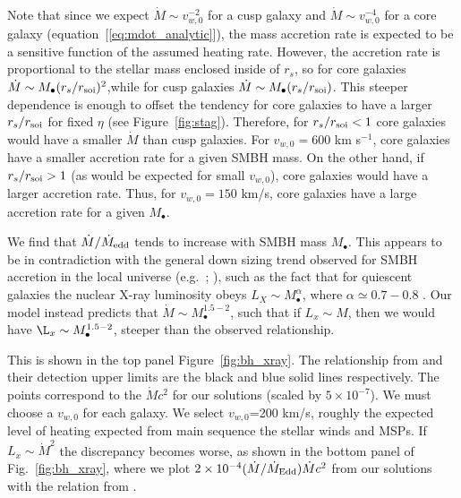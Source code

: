 \documentclass[usenatbib,fleqn]{mn2e}
\newcommand{\Mdot}{\dot{M}}
\newcommand{\eddr}{\dot{M}/\dot{M}_{\rm Edd}}
\newcommand{\rs}{r_s}
\newcommand{\Mbh}[1][]{M_{\bullet#1}}
\newcommand{\soi}{\rm soi}
\newcommand{\rsoi}{r_{\soi}}
\newcommand{\vwO}{v_{w,0}}
\begin{document}
Note that since we expect $\dot{M}\sim\vwO^{-2}$ for a cusp galaxy and
$\dot{M}\sim\vwO^{-4}$ for a core galaxy
(equation~[\ref{eq:mdot_analytic}]), the mass accretion rate is
expected to be a sensitive function of the assumed heating rate.
However, the accretion rate is proportional to the stellar mass
enclosed inside of $\rs$, so for core galaxies $\dot{M}\sim \Mbh
(\rs/\rsoi)^{2}$,while for cusp galaxies $\dot{M}\sim \Mbh
(\rs/\rsoi)$.  This steeper dependence is enough to offset the
tendency for core galaxies to have a larger $\rs/\rsoi$ for fixed
$\eta$ (see Figure~\ref{fig:stag}). Therefore, for $\rs/\rsoi<1$ core
galaxies would have a smaller $\dot{M}$ than cusp galaxies.  For
$\vwO=600$ km s$^{-1}$, core galaxies have a smaller accretion rate
for a given SMBH mass. On the other hand, if  $\rs/\rsoi>1$ (as would
be expected for small $\vwO$), core galaxies would have a larger
accretion rate. Thus, for $\vwO=150$ km/s, core galaxies have a large
accretion rate for a given $\Mbh$.  

We find that $\dot{M}/\dot{M}_{\rm edd}$ tends to increase with SMBH
mass $M_{\bullet}$.  This appears to be in contradiction with the
general down sizing trend observed for SMBH accretion in the local
universe (e.g.~\citealt{Heckman+04}; \citealt{Gallo+08}), such as the
fact that for quiescent galaxies the nuclear X-ray luminosity obeys
$L_X \sim \Mbh^\alpha$, where $\alpha\simeq 0.7-0.8$
\citep{MillerGallo+:2014a}.  Our model instead predicts that $\Mdot
\sim \Mbh^{1.5-2}$, such that if $L_x\sim M$, then we would have $\L_x
\sim \Mbh^{1.5-2}$, steeper than the observed relationship. 

This is shown in the top panel Figure~\ref{fig:bh_xray}. The
relationship from \citealt{MillerGallo+:2014a} and their detection
upper limits are the black and blue solid lines
respectively. The points correspond to the $\dot{M} c^2$ for our
solutions (scaled by $5\times 10^{-7}$).  We must choose a $\vwO$ for
each galaxy.  We select $\vwO$=200 km/s, roughly the expected level of
heating expected from main sequence the stellar winds and MSPs. If
$L_x \sim \Mdot^2$ the discrepancy becomes worse, as shown in the
bottom panel of Fig.~\ref{fig:bh_xray}, where we plot $2 \times
10^{-4} (\eddr) \Mdot c^2$ from our solutions with the relation from
\citealt{MillerGallo+:2014a}.
\end{document}
